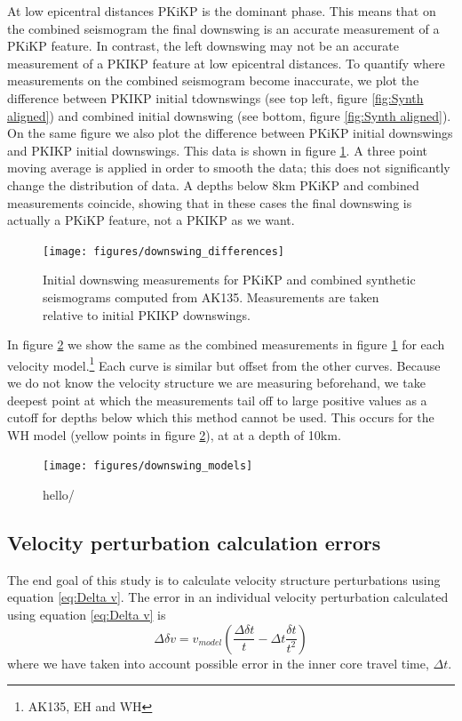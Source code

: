 \documentclass[11pt,a4paper]{article}
\begin{document}
At low epicentral distances PKiKP is the dominant phase. This means that on the combined seismogram the final downswing is an accurate measurement of a PKiKP feature. In contrast, the left downswing may not be an accurate measurement of a PKIKP feature at low epicentral distances. To quantify where measurements on the combined seismogram become inaccurate, we plot the difference between PKIKP initial tdownswings (see top left, figure \ref{fig:Synth aligned}) and combined initial downswing (see bottom, figure \ref{fig:Synth aligned}). On the same figure we also plot the difference between PKiKP initial downswings and PKIKP initial downswings. This data is shown in figure \ref{fig:Downswing differences}. A three point moving average is applied in order to smooth the data; this does not significantly change the distribution of data. A depths below 8km PKiKP and combined measurements coincide, showing that in these cases the final downswing is actually a PKiKP feature, not a PKIKP as we want.

\begin{figure}
	\centering
	\texttt{[image: figures/downswing\_differences]}
	\caption{Initial downswing measurements for PKiKP and combined synthetic seismograms computed from AK135. Measurements are taken relative to initial PKIKP downswings.}
	\label{fig:Downswing differences}
\end{figure}

In figure \ref{fig:Downswing models} we show the same as the combined measurements in figure \ref{fig:Downswing differences} for each velocity model.\footnote{AK135, EH and WH} Each curve is similar but offset from the other curves. Because we do not know the velocity structure we are measuring beforehand, we take deepest point at which the measurements tail off to large positive values as a cutoff for depths below which this method cannot be used. This occurs for the WH model (yellow points in figure \ref{fig:Downswing models}), at at a depth of 10km.

\begin{figure}
	\centering
	\texttt{[image: figures/downswing\_models]}
	\caption{hello/}
	\label{fig:Downswing models}
\end{figure}

\subsection{Velocity perturbation calculation errors}
The end goal of this study is to calculate velocity structure perturbations using equation \eqref{eq:Delta v}. The error in an individual velocity perturbation calculated using equation \eqref{eq:Delta v} is
\begin{equation}
	\Delta \delta v = v_{model} \left ( \frac{\Delta \delta t}{t} - \Delta t \frac{\delta t}{t^{2}} \right )
	\label{eq:Velocity error}
\end{equation}
where we have taken into account possible error in the inner core travel time, $\Delta t$.
\end{document}
